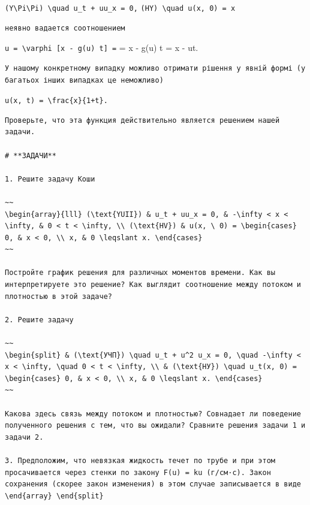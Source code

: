 \documentclass[
  ukrainian,
]{article}
\begin{document}
\texttt{(Y\textbackslash{}Pi\textbackslash{}Pi)\ \textbackslash{}quad\ u\_t\ +\ uu\_x\ =\ 0,}
\texttt{(HY)\ \textbackslash{}quad\ u(x,\ 0)\ =\ x}

\begin{verbatim}
неявно вадается соотношением
\end{verbatim}

\texttt{u\ =\ \textbackslash{}varphi\ {[}x\ -\ g(u)\ t{]}\ =} = x - g(u)
t = x - ut.

\begin{verbatim}
У нашому конкретному випадку можливо отримати рішення у явній формі (у багатьох інших випадках це неможливо)
\end{verbatim}

\texttt{u(x,\ t)\ =\ \textbackslash{}frac\{x\}\{1+t\}.}

\begin{verbatim}
Проверьте, что эта функция действительно является решением нашей задачи.

# **ЗАДАЧИ**

1. Решите задачу Коши

~~
\begin{array}{lll} (\text{YUII}) & u_t + uu_x = 0, & -\infty < x < \infty, & 0 < t < \infty, \\ (\text{HV}) & u(x, \ 0) = \begin{cases} 0, & x < 0, \\ x, & 0 \leqslant x. \end{cases}
~~

Постройте график решения для различных моментов времени. Как вы интерпретируете это решение? Как выглядит соотношение между потоком и плотностью в этой задаче?

2. Решите задачу

~~
\begin{split} & (\text{УЧП}) \quad u_t + u^2 u_x = 0, \quad -\infty < x < \infty, \quad 0 < t < \infty, \\ & (\text{НУ}) \quad u_t(x, 0) = \begin{cases} 0, & x < 0, \\ x, & 0 \leqslant x. \end{cases}
~~

Какова здесь связь между потоком и плотностью? Совнадает ли поведение полученного решения с тем, что вы ожидали? Сравните решения задачи 1 и задачи 2.

3. Предположим, что невязкая жидкость течет по трубе и при этом просачивается через стенки по закону F(u) = ku (г/см·с). Закон сохранения (скорее закон изменения) в этом случае записывается в виде \end{array} \end{split}
\end{verbatim}
\end{document}
